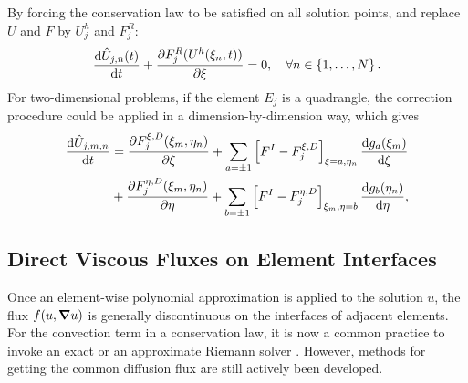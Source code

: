 \documentclass[10pt,draft]{article}
\begin{document}
%
By forcing the conservation law to be satisfied on all solution points, and replace $U$ and $F$ by $U_j^h$ and $F_j^{R}$:
$$
\dv{\hat{U}_{j,n}(t)}{t}+\pdv{F_j^{R}(U^{h}(\xi_{n},t))}{\xi}=0,\quad\forall n\in\left\{ 1,\dots,N\right\}.
$$
%
For two-dimensional problems, if the element $E_j$ is a quadrangle, the correction procedure could be applied in a dimension-by-dimension way, which gives
$$
\begin{aligned}\dv{\hat{U}_{j,m,n}}{t} & =\frac{\partial F_{j}^{\xi,D}(\xi_{m},\eta_{n})}{\partial\xi}+\sum_{a=\pm1}\left[F^{I}-F_{j}^{\xi,D}\right]_{\xi=a,\eta_{n}}\dv{g_{a}(\xi_{m})}{\xi}\\
 & +\frac{\partial F_{j}^{\eta,D}(\xi_{m},\eta_{n})}{\partial\eta}+\sum_{b=\pm1}\left[F^{I}-F_{j}^{\eta,D}\right]_{\xi_{m},\eta=b}\dv{g_{b}(\eta_{n})}{\eta},
\end{aligned}
$$

\subsection{Direct Viscous Fluxes on Element Interfaces}
Once an element-wise polynomial approximation is applied to the solution $u$, the flux $f(u,\grad u)$ is generally discontinuous on the interfaces of adjacent elements.
%
For the convection term in a conservation law, it is now a common practice to invoke an exact or an approximate Riemann solver \cite{Toro_2009}.
However, methods for getting the common diffusion flux are still actively been developed.
\end{document}
